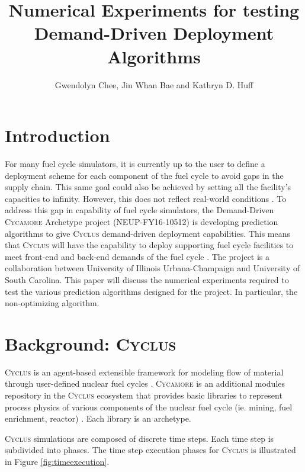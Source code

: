 \documentclass{anstrans}
\title{Numerical Experiments for testing Demand-Driven Deployment Algorithms}
\author{Gwendolyn Chee, Jin Whan Bae and Kathryn D. Huff}
\institute{
Dept. of Nuclear, Plasma and Radiological Engineering, University of Illinois at Urbana-Champaign \\
gchee2@illinois.edu
}
\newcommand{\Cyclus}{\textsc{Cyclus}\xspace}%
\newcommand{\Cycamore}{\textsc{Cycamore}\xspace}%
\begin{document}
\section{Introduction}
For many fuel cycle simulators, it is currently up to the user to define a deployment scheme for each component of the fuel cycle to avoid gaps in the supply chain. This same goal could also be achieved by setting all the facility's capacities to infinity. However, this does not reflect real-world conditions \cite{bae_numerical_2018}. To address this gap in capability of fuel cycle simulators, the Demand-Driven \Cycamore Archetype project (NEUP-FY16-10512) is developing prediction algorithms to give \Cyclus demand-driven deployment capabilities. This means that \Cyclus will have the capability to deploy supporting fuel cycle facilities to meet front-end and back-end demands of the fuel cycle \cite{bae_numerical_2018}. The project is a collaboration between University of Illinois Urbana-Champaign and University of South Carolina. This paper will discuss the numerical experiments required to test the various prediction algorithms designed for the project. In particular, the non-optimizing algorithm. 

\section{Background: \Cyclus}
\Cyclus \cite{carlsen_cyclus_2014} is an agent-based extensible framework for modeling flow of material through user-defined nuclear fuel cycles \cite{huff_fundamental_2016}. \Cycamore \cite{carlsen_cycamore_2014} is an additional modules repository in the \Cyclus ecosystem that provides basic libraries to represent process physics of various components of the nuclear fuel cycle (ie. mining, fuel enrichment, reactor) \cite{huff_extensions_2014}. Each library is an archetype. 

\Cyclus simulations are composed of discrete time steps. Each time step is subdivided into phases. The time step execution phases for \Cyclus is illustrated in Figure \ref{fig:timeexecution}. 
\end{document}
